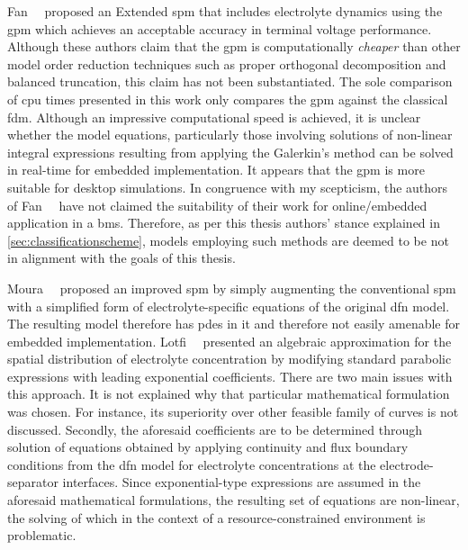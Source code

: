 
Fan~\etal~\cite{Fan2016}   proposed   an   Extended  \gls{spm}   that   includes
electrolyte dynamics using  the \gls{gpm} which achieves  an acceptable accuracy
in terminal voltage performance. Although these authors claim that the \gls{gpm}
is computationally  \emph{cheaper} than  other model order  reduction techniques
such as proper orthogonal decomposition  and balanced truncation, this claim has
not been substantiated. The sole comparison of \gls{cpu} times presented in this
work  only compares  the  \gls{gpm} against  the  classical \gls{fdm}.  Although
an  impressive  computational speed  is  achieved,  it  is unclear  whether  the
model equations,  particularly those involving solutions  of non-linear integral
expressions  resulting from  applying the  Galerkin's  method can  be solved  in
real-time for  embedded implementation.  It appears that  the \gls{gpm}  is more
suitable for desktop simulations. In  congruence with my scepticism, the authors
of Fan~\etal~\cite{Fan2016} have  not claimed the suitability of  their work for
online/embedded  application  in a  \gls{bms}.  Therefore,  as per  this  thesis
authors' stance  explained in \cref{sec:classificationscheme},  models employing
such methods are deemed to be not in alignment with the goals of this thesis.

Moura~\etal~\cite{Moura2017} proposed an improved \gls{spm} by simply augmenting
the  conventional  \gls{spm}  with  a simplified  form  of  electrolyte-specific
equations of  the original  \gls{dfn} model. The  resulting model  therefore has
\glspl{pde} in it and therefore not easily amenable for embedded implementation.
Lotfi~\etal~\cite{Lotfi2017}  presented  an   algebraic  approximation  for  the
spatial  distribution   of  electrolyte  concentration  by   modifying  standard
parabolic expressions with leading exponential  coefficients. There are two main
issues with this approach. It is  not explained why that particular mathematical
formulation was chosen. For instance, its superiority over other feasible family
of  curves is  not discussed.  Secondly, the  aforesaid coefficients  are to  be
determined through  solution of  equations obtained  by applying  continuity and
flux boundary conditions from the \gls{dfn} model for electrolyte concentrations
at  the  electrode-separator   interfaces.  Since  exponential-type  expressions
are  assumed  in the  aforesaid  mathematical  formulations, the  resulting  set
of  equations  are  non-linear,  the  solving  of which  in  the  context  of  a
resource-constrained environment is problematic.

